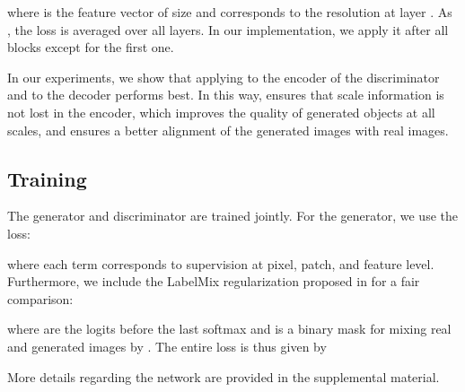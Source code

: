 \documentclass{bmvc2k}
\begin{document}
where  is the feature vector of size  and  corresponds to the resolution at layer . As , the loss  is averaged over all layers. In our implementation, we apply it after all blocks except for the first one. 


In our experiments, we show that applying  to the encoder of the discriminator and  to the decoder performs best. In this way,  ensures that scale information is not lost in the encoder, which improves the quality of generated objects at all scales, and  ensures a better alignment of the generated images with real images. 










\subsection{Training}
The generator and discriminator are trained jointly. For the generator, we use the loss: 

where each term corresponds to supervision at pixel, patch, and feature level. Furthermore, 
we include the LabelMix regularization proposed in \cite{schonfeld_sushko_iclr2021} for a fair comparison:

where  are the logits before the last softmax and  is a binary mask for mixing real and generated images  by 
. The entire loss is thus given by 

More details regarding the network are provided in the supplemental material.  
\end{document}
